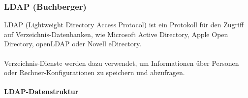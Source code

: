 \subsubsection{LDAP (Buchberger)}

LDAP (Lightweight Directory Access Protocol) ist ein Protokoll für den Zugriff auf Verzeichnis-Datenbanken, wie Microsoft Active Directory, Apple Open Directory, openLDAP oder Novell eDirectory.\\
\\
Verzeichnis-Dienste werden dazu verwendet, um Informationen über Personen oder Rechner-Konfigurationen zu speichern und abzufragen.\\

\paragraph{LDAP-Datenstruktur}

